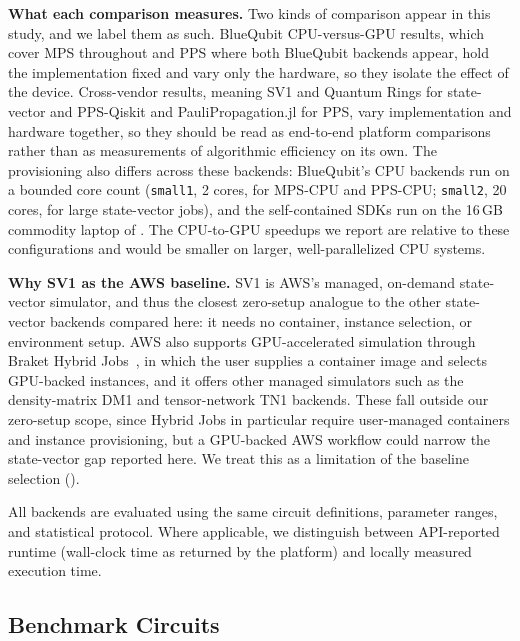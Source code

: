 \documentclass[conference,10pt]{IEEEtran}
\begin{document}
    \textbf{What each comparison measures.} Two kinds of comparison appear in this study, and we label them as such. BlueQubit CPU-versus-GPU results, which cover MPS throughout and PPS where both BlueQubit backends appear, hold the implementation fixed and vary only the hardware, so they isolate the effect of the device. Cross-vendor results, meaning SV1 and Quantum Rings for state-vector and PPS-Qiskit and PauliPropagation.jl for PPS, vary implementation and hardware together, so they should be read as end-to-end platform comparisons rather than as measurements of algorithmic efficiency on its own. The provisioning also differs across these backends: BlueQubit's CPU backends run on a bounded core count (\texttt{small1}, 2 cores, for MPS-CPU and PPS-CPU; \texttt{small2}, 20 cores, for large state-vector jobs), and the self-contained SDKs run on the 16\,GB commodity laptop of . The CPU-to-GPU speedups we report are relative to these configurations and would be smaller on larger, well-parallelized CPU systems.

    \textbf{Why SV1 as the AWS baseline.} SV1 is AWS's managed, on-demand state-vector simulator, and thus the closest zero-setup analogue to the other state-vector backends compared here: it needs no container, instance selection, or environment setup. AWS also supports GPU-accelerated simulation through Braket Hybrid Jobs~\cite{braket_jobs}, in which the user supplies a container image and selects GPU-backed instances, and it offers other managed simulators such as the density-matrix DM1 and tensor-network TN1 backends. These fall outside our zero-setup scope, since Hybrid Jobs in particular require user-managed containers and instance provisioning, but a GPU-backed AWS workflow could narrow the state-vector gap reported here. We treat this as a limitation of the baseline selection ().

    All backends are evaluated using the same circuit definitions, parameter ranges, and statistical protocol. Where applicable, we distinguish between API-reported runtime (wall-clock time as returned by the platform) and locally measured execution time.
    
    \subsection{Benchmark Circuits}
     
\end{document}
